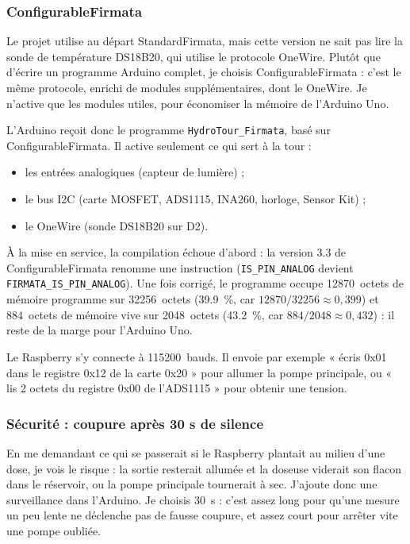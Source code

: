 \subsubsection*{ConfigurableFirmata}

Le projet utilise au départ StandardFirmata, mais cette version ne sait pas lire la sonde de température DS18B20, qui utilise le protocole OneWire. Plutôt que d'écrire un programme Arduino complet, je choisis ConfigurableFirmata : c'est le même protocole, enrichi de modules supplémentaires, dont le OneWire. Je n'active que les modules utiles, pour économiser la mémoire de l'Arduino Uno.

L'Arduino reçoit donc le programme \texttt{HydroTour\_Firmata}, basé sur ConfigurableFirmata. Il active seulement ce qui sert à la tour :

\begin{itemize}
\item les entrées analogiques (capteur de lumière) ;
\item le bus I2C (carte MOSFET, ADS1115, INA260, horloge, Sensor Kit) ;
\item le OneWire (sonde DS18B20 sur D2).
\end{itemize}

À la mise en service, la compilation échoue d'abord : la version 3.3 de ConfigurableFirmata renomme une instruction (\texttt{IS\_PIN\_ANALOG} devient \texttt{FIRMATA\_IS\_PIN\_ANALOG}). Une fois corrigé, le programme occupe \qty{12870}{octets} de mémoire programme sur \qty{32256}{octets} (\qty{39,9}{\percent}, car $12870/32256 \approx 0{,}399$) et \qty{884}{octets} de mémoire vive sur \qty{2048}{octets} (\qty{43,2}{\percent}, car $884/2048 \approx 0{,}432$) : il reste de la marge pour l'Arduino Uno.

Le Raspberry s'y connecte à \qty{115200}{bauds}. Il envoie par exemple « écris 0x01 dans le registre 0x12 de la carte 0x20 » pour allumer la pompe principale, ou « lis 2 octets du registre 0x00 de l'ADS1115 » pour obtenir une tension.

\subsubsection*{Sécurité : coupure après 30 s de silence}

En me demandant ce qui se passerait si le Raspberry plantait au milieu d'une dose, je vois le risque : la sortie resterait allumée et la doseuse viderait son flacon dans le réservoir, ou la pompe principale tournerait à sec. J'ajoute donc une surveillance dans l'Arduino. Je choisis \qty{30}{s} : c'est assez long pour qu'une mesure un peu lente ne déclenche pas de fausse coupure, et assez court pour arrêter vite une pompe oubliée.

